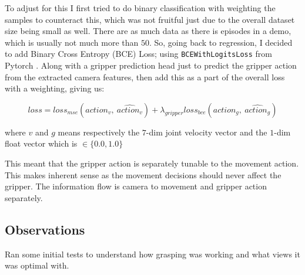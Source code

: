 To adjust for this I first tried to do binary classification with weighting the samples to counteract this, which was not fruitful just due to the overall dataset size being small as well. There are as much data as there is episodes in a demo, which is usually not much more than $50$. So, going back to regression, I decided to add Binary Cross Entropy (BCE) Loss; using \verb|BCEWithLogitsLoss| from Pytorch . Along with a gripper prediction head just to predict the gripper action from the extracted camera features, then add this as a part of the overall loss with a weighting, giving us:

\[
  loss = loss_{mse} \left(action_{v}, ~\widehat{action_v}\right) 
  + 
  \lambda_{gripper} loss_{bce}\left( action_{g}, ~\widehat{action_g}\right)
\]

where $v$ and $g$ means respectively the $7$-dim joint velocity vector and the $1$-dim float vector which is \( \in \{ 0.0, 1.0 \}\)

This meant that the gripper action is separately tunable to the movement action. This makes inherent sense as the movement decisions should never affect the gripper. The information flow is camera to movement and gripper action separately.  

\subsection{Observations}
Ran some initial tests to understand how grasping was working and what views it was optimal with.

